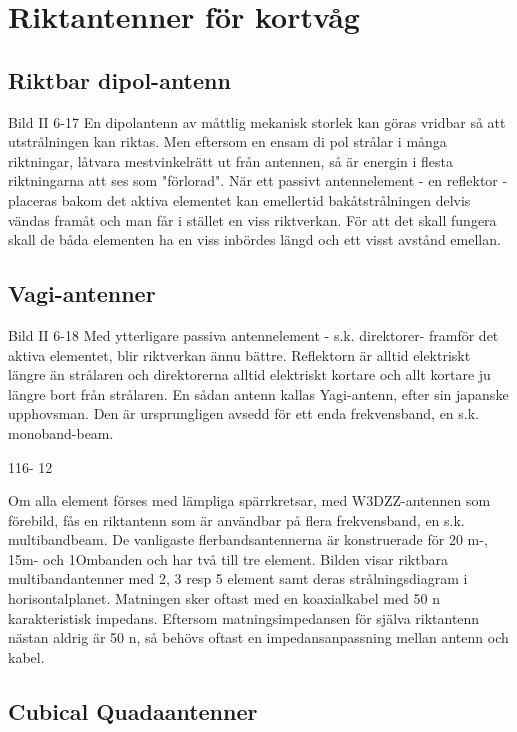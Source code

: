 \section{Riktantenner för kortvåg}

\subsection{Riktbar dipol-antenn}
Bild II 6-17
En dipolantenn av måttlig mekanisk storlek
kan göras vridbar så att utstrålningen kan
riktas. Men eftersom en ensam di pol strålar
i många riktningar, låtvara mestvinkelrätt ut
från antennen, så är energin i flesta riktningarna att ses som "förlorad". När ett passivt
antennelement - en reflektor - placeras
bakom det aktiva elementet kan emellertid
bakåtstrålningen delvis vändas framåt och
man får i stället en viss riktverkan. För att det
skall fungera skall de båda elementen ha en
viss inbördes längd och ett visst avstånd
emellan.


\subsection{Vagi-antenner}

Bild II 6-18
Med ytterligare passiva antennelement
- s.k. direktorer- framför det aktiva elementet, blir riktverkan ännu bättre. Reflektorn är
alltid elektriskt längre än strålaren och
direktorerna alltid elektriskt kortare och allt
kortare ju längre bort från strålaren. En
sådan antenn kallas Yagi-antenn, efter sin
japanske upphovsman. Den är ursprungligen avsedd för ett enda frekvensband, en
s.k. monoband-beam.

116- 12

Om alla element förses med lämpliga
spärrkretsar, med W3DZZ-antennen som
förebild, fås en riktantenn som är användbar
på flera frekvensband, en s.k. multibandbeam. De vanligaste flerbandsantennerna
är konstruerade för 20 m-, 15m- och 1Ombanden och har två till tre element.
Bilden visar riktbara multibandantenner
med 2, 3 resp 5 element samt deras strålningsdiagram i horisontalplanet.
Matningen sker oftast med en koaxialkabel med 50 n karakteristisk impedans. Eftersom matningsimpedansen för själva riktantenn nästan aldrig är 50 n, så behövs
oftast en impedansanpassning mellan antenn och kabel.


\subsection{Cubical Quadaantenner}

